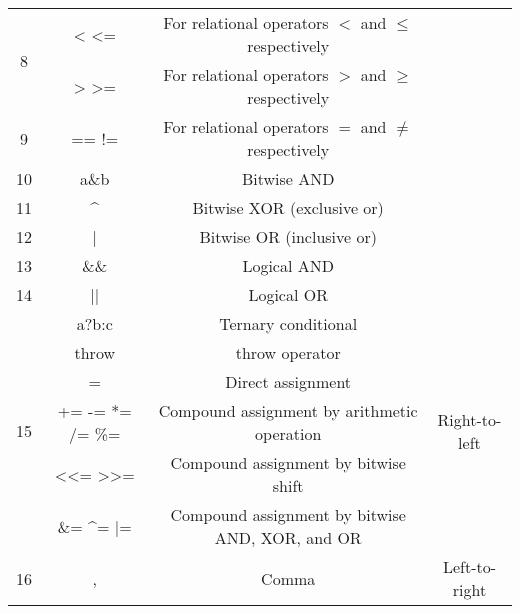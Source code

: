 \begin{center}
\begin{tabular}{|c|c|c|c|}
		\multirow{2}{*}{8}	&	\ttfamily < <=				&	For relational operators $<$ and $\leq$ respectively	&									\\
							&	\ttfamily > >=				&	For relational operators $>$ and $\geq$ respectively	&									\\
		\cline{1-3}
		9					&	\ttfamily == !=				&	For relational operators $=$ and $\neq$ respectively	&									\\
		\cline{1-3}
		10					&	\ttfamily a\&b				&	Bitwise AND												&									\\
		\cline{1-3}
		11					&	\ttfamily \^{}				&	Bitwise XOR (exclusive or)								&									\\
		\cline{1-3}
		12					&	\ttfamily |					&	Bitwise OR (inclusive or)								&									\\
		\cline{1-3}
		13					&	\ttfamily \&\&				&	Logical AND												&									\\
		\cline{1-3}
		14					&	\ttfamily ||				&	Logical OR												&									\\
		\hline
		\multirow{6}{*}{15}	&	\ttfamily a?b:c				&	Ternary conditional										&	\multirow{6}{*}{Right-to-left}	\\
							&	\ttfamily throw				&	throw operator											&									\\
							&	\ttfamily =					&	Direct assignment										&									\\
							&	\ttfamily += -=	*= /= \%=	&	Compound assignment by arithmetic operation				&									\\
							&	\ttfamily <<= >>=			&	Compound assignment by bitwise shift					&									\\
							&	\ttfamily \&= \^{}= |=		&	Compound assignment by bitwise AND, XOR, and OR			&									\\
		\hline
		16					&	\ttfamily ,					&	Comma													&	Left-to-right					\\
		\hline
	\end{tabular}
\end{center}

